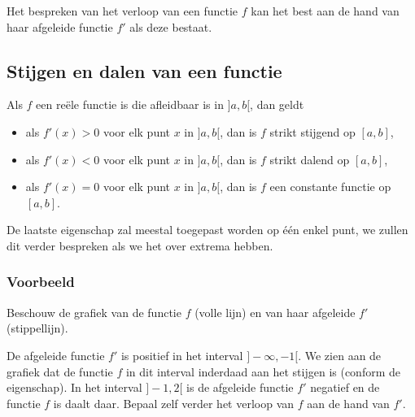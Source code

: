 \documentclass[12pt]{article}
\newenvironment{eigenschap}
{
  \begin{mdframed}[nobreak=true,frametitle={Eigenschap}]
  }{%
  \end{mdframed}
}
\begin{document}
Het bespreken van het verloop van een functie $f$ kan het best aan de hand van haar afgeleide functie $f'$ als deze bestaat.

\subsection{Stijgen en dalen van een functie}

\begin{eigenschap}
  Als $f$ een reële functie is die afleidbaar is in $]a,b[$, dan geldt
  \begin{itemize}
  \item als $f'(x)>0$ voor elk punt $x$ in $]a,b[$, dan is $f$ strikt stijgend op $[a,b]$,
  \item als $f'(x)<0$ voor elk punt $x$ in $]a,b[$, dan is $f$ strikt dalend op $[a,b]$,
  \item als $f'(x)=0$ voor elk punt $x$ in $]a,b[$, dan is $f$ een constante functie op $[a,b]$.
  \end{itemize}
\end{eigenschap}

De laatste eigenschap zal meestal toegepast worden op één enkel punt, we zullen dit verder bespreken als we het over extrema hebben.

\subsubsection*{Voorbeeld}

Beschouw de grafiek van de functie $f$ (volle lijn) en van haar afgeleide $f'$ (stippellijn).
\begin{center}
\end{center}
De afgeleide functie $f'$ is positief in het interval $]-\infty, -1[$. We zien aan de grafiek dat de functie $f$ in dit interval inderdaad aan het stijgen is (conform de eigenschap). In het interval $]-1, 2[$ is de afgeleide functie $f'$ negatief en de functie $f$ is daalt daar. Bepaal zelf verder het verloop van $f$ aan de hand van $f'$.
\end{document}
